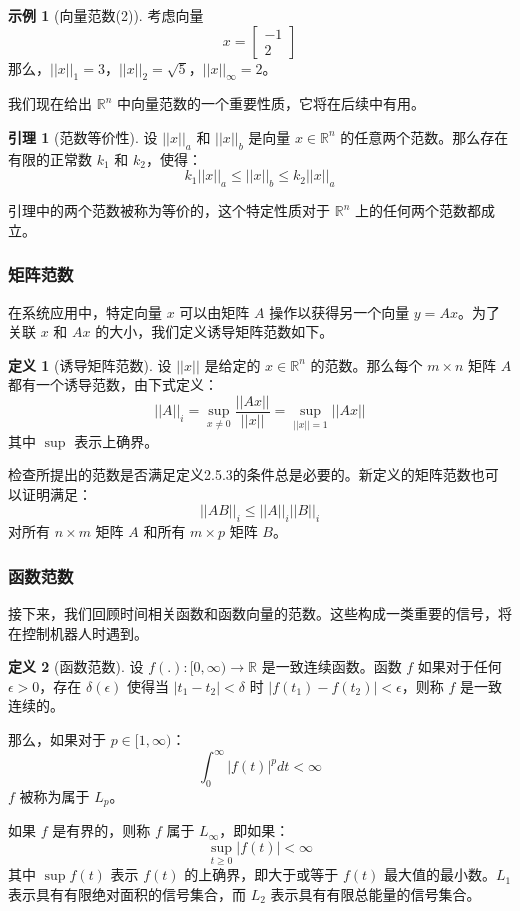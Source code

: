 \documentclass[UTF8,12pt,a4paper]{ctexart}
\theoremstyle{definition}
\newtheorem{definition}{定义}[section]
\newtheorem{lemma}{引理}[section]
\newtheorem{example}{示例}[section]
\begin{document}
\begin{example}[向量范数(2)]
考虑向量
\[
x = \begin{bmatrix} -1 \\ 2 \end{bmatrix}
\]
那么，$||x||_1 = 3$，$||x||_2 = \sqrt{5}$，$||x||_\infty = 2$。
\end{example}

我们现在给出 $\mathbb{R}^n$ 中向量范数的一个重要性质，它将在后续中有用。

\begin{lemma}[范数等价性]
设 $||x||_a$ 和 $||x||_b$ 是向量 $x \in \mathbb{R}^n$ 的任意两个范数。那么存在有限的正常数 $k_1$ 和 $k_2$，使得：
\[
k_1 ||x||_a \leq ||x||_b \leq k_2 ||x||_a
\]
\end{lemma}
引理中的两个范数被称为等价的，这个特定性质对于 $\mathbb{R}^n$ 上的任何两个范数都成立。

\subsubsection{矩阵范数}

在系统应用中，特定向量 $x$ 可以由矩阵 $A$ 操作以获得另一个向量 $y=Ax$。为了关联 $x$ 和 $Ax$ 的大小，我们定义诱导矩阵范数如下。

\begin{definition}[诱导矩阵范数]
设 $||x||$ 是给定的 $x \in \mathbb{R}^n$ 的范数。那么每个 $m \times n$ 矩阵 $A$ 都有一个诱导范数，由下式定义：
\[
||A||_i = \sup_{x \neq 0} \frac{||Ax||}{||x||} = \sup_{||x||=1} ||Ax||
\]
其中 $\sup$ 表示上确界。
\end{definition}

检查所提出的范数是否满足定义2.5.3的条件总是必要的。新定义的矩阵范数也可以证明满足：
\[
||AB||_i \leq ||A||_i ||B||_i
\]
对所有 $n \times m$ 矩阵 $A$ 和所有 $m \times p$ 矩阵 $B$。

\subsubsection{函数范数}

接下来，我们回顾时间相关函数和函数向量的范数。这些构成一类重要的信号，将在控制机器人时遇到。

\begin{definition}[函数范数]
设 $f(.): [0, \infty) \rightarrow \mathbb{R}$ 是一致连续函数。函数 $f$ 如果对于任何 $\epsilon > 0$，存在 $\delta(\epsilon)$ 使得当 $|t_1-t_2|<\delta$ 时 $|f(t_1)-f(t_2)|<\epsilon$，则称 $f$ 是一致连续的。

那么，如果对于 $p \in [1, \infty)$：
\[
\int_0^{\infty} |f(t)|^p dt < \infty
\]
$f$ 被称为属于 $L_p$。

如果 $f$ 是有界的，则称 $f$ 属于 $L_\infty$，即如果：
\[
\sup_{t \geq 0} |f(t)| < \infty
\]
其中 $\sup f(t)$ 表示 $f(t)$ 的上确界，即大于或等于 $f(t)$ 最大值的最小数。$L_1$ 表示具有有限绝对面积的信号集合，而 $L_2$ 表示具有有限总能量的信号集合。
\end{definition}
\end{document}
